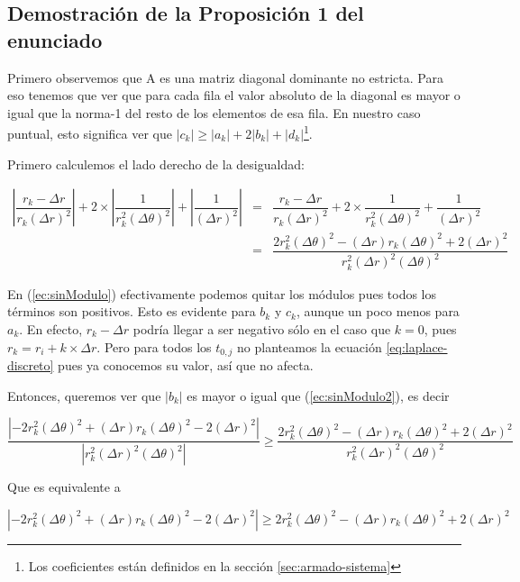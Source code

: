 \subsection{Demostración de la Proposición 1 del enunciado}
Primero observemos que A es una matriz diagonal dominante no estricta. Para eso tenemos que ver que para cada fila el valor absoluto de la diagonal es mayor o igual que la norma-1 del resto de los elementos de esa fila. En nuestro caso puntual, esto significa ver que 
$|c_k| \geq |a_k| + 2|b_k| + |d_k|$\footnote{Los coeficientes están definidos en la sección \ref{sec:armado-sistema}}.

Primero calculemos el lado derecho de la desigualdad:

\begin{eqnarray}
\label{ec:sinModulo}
\left\vert \dfrac{r_k - \Delta r}{r_k (\Delta r)^2}\right\vert +
2 \times \left\vert \dfrac{1}{r_k^2(\Delta \theta)^2} \right\vert+
\left\vert \dfrac{1}{(\Delta r)^2} \right\vert & = &
\dfrac{r_k - \Delta r }{r_k (\Delta r)^2} +
2 \times \dfrac{1}{r_k^2(\Delta \theta)^2} +
\dfrac{1}{(\Delta r)^2}\\ 
& = & 
\label{ec:sinModulo2}
\dfrac{2 r_k^2 (\Delta \theta)^2 - (\Delta r) r_k (\Delta \theta)^2 + 2 (\Delta r)^2}{r_k^2 (\Delta r)^2 (\Delta \theta)^2}
\end{eqnarray}

En (\ref{ec:sinModulo}) efectivamente podemos quitar los módulos pues todos los términos son positivos. Esto es evidente para $b_k$ y $c_k$, aunque un poco menos para $a_k$. En efecto, $r_k - \Delta r$ podría llegar a ser negativo sólo en el caso que $k = 0$, pues $r_k = r_i + k\times \Delta r$. Pero para todos los $t_{0,j}$ no planteamos la ecuación \ref{eq:laplace-discreto} pues ya conocemos su valor, así que no afecta.
 
Entonces, queremos ver que $|b_k|$ es mayor o igual que (\ref{ec:sinModulo2}), es decir

\begin{equation*}
\dfrac{\left\vert -2 r_k^2 (\Delta \theta)^2 + (\Delta r) r_k (\Delta \theta)^2 - 2 (\Delta r)^2 \right\vert } 
{\left\vert r_k^2 (\Delta r)^2 (\Delta \theta)^2 \right\vert } \geq
\dfrac{2 r_k^2 (\Delta \theta)^2 - (\Delta r) r_k (\Delta \theta)^2 + 2 (\Delta r)^2}{r_k^2 (\Delta r)^2 (\Delta \theta)^2}
\end{equation*}

Que es equivalente a

\begin{equation*}
\left\vert -2 r_k^2 (\Delta \theta)^2 + (\Delta r) r_k (\Delta \theta)^2 - 2 (\Delta r)^2 \right\vert \geq
2 r_k^2 (\Delta \theta)^2 - (\Delta r) r_k (\Delta \theta)^2 + 2 (\Delta r)^2
\end{equation*}

